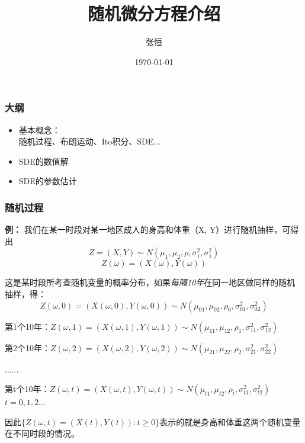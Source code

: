 \documentclass{ctexbeamer}
\title{随机微分方程介绍}
\author{张恒}
\date{\today}
\begin{document}



    \begin{frame} 

        \titlepage   

    \end{frame}



    \begin{frame}

        \frametitle{大纲}

		\begin{itemize}
			\item 基本概念：\\
				随机过程、布朗运动、Ito积分、SDE...
			\item SDE的数值解
			\item SDE的参数估计
	
		\end{itemize}



    \end{frame}



    \begin{frame}

        \frametitle{随机过程}
		\small

		\textbf{例：} 我们在某一时段对某一地区成人的身高和体重（X, Y）进行随机抽样，可得出 
$$Z = (X,Y) \sim N(\mu_1,\mu_2,\rho,\sigma^2_1,\sigma^2_1)$$
$$Z(\omega) = (X(\omega),Y(\omega))$$

 这是某时段所考查随机变量的概率分布，如果\textit{每隔10年}在同一地区做同样的随机抽样，得： \\
$$Z(\omega,0)=(X(\omega,0),Y(\omega,0)) \sim N(\mu_{01},\mu_{02},\rho_0,\sigma^2_{01},\sigma^2_{02})$$

 第1个10年：$Z(\omega,1)=(X(\omega,1),Y(\omega,1)) \sim N(\mu_{11},\mu_{12},\rho_1,\sigma^2_{11},\sigma^2_{12})$

 第2个10年：$Z(\omega,2)=(X(\omega,2),Y(\omega,2)) \sim N(\mu_{21},\mu_{22},\rho_2,\sigma^2_{21},\sigma^2_{22})$

 ......

 第t个10年：$Z(\omega,t)=(X(\omega,t),Y(\omega,t)) \sim N(\mu_{t1},\mu_{t2},\rho_t,\sigma^2_{t1},\sigma^2_{t2})$ $t = 0,1,2...$

因此$\{Z(\omega,t)=(X(t),Y(t)): t \geq 0\}$表示的就是身高和体重这两个随机变量在不同时段的情况。


   \end{frame}
\end{document}
